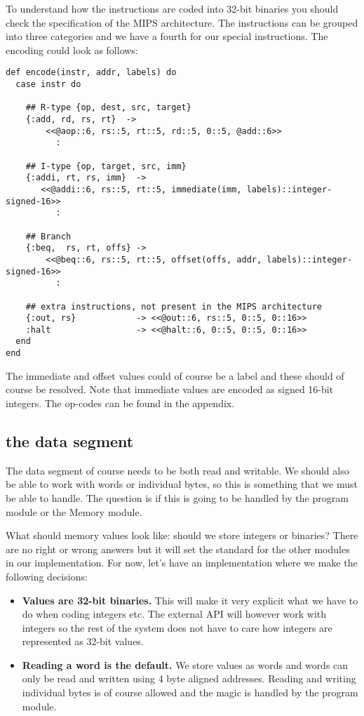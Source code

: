 \documentclass[a4paper,11pt]{article}
\begin{document}
To understand how the instructions are coded into 32-bit binaries you
should check the specification of the MIPS architecture. The
instructions can be grouped into three categories and we have a fourth
for our special instructions. The encoding could look as follows:

\begin{verbatim}
def encode(instr, addr, labels) do
  case instr do

    ## R-type {op, dest, src, target}
    {:add, rd, rs, rt}  -> 
        <<@aop::6, rs::5, rt::5, rd::5, 0::5, @add::6>>
          :

    ## I-type {op, target, src, imm}  
    {:addi, rt, rs, imm}  -> 
       <<@addi::6, rs::5, rt::5, immediate(imm, labels)::integer-signed-16>>	
          :
        
    ## Branch 
    {:beq,  rs, rt, offs} -> 
        <<@beq::6, rs::5, rt::5, offset(offs, addr, labels)::integer-signed-16>>
          :

    ## extra instructions, not present in the MIPS architecture 
    {:out, rs}            -> <<@out::6, rs::5, 0::5, 0::16>>
    :halt                 -> <<@halt::6, 0::5, 0::5, 0::16>>	
  end
end
\end{verbatim}

The immediate and offset values could of course be a label and these
should of course be resolved. Note that immediate values are encoded
as signed 16-bit integers. The op-codes can be found in the appendix. 

\subsection{the data segment}

The data segment of course needs to be both read and writable. We
should also be able to work with words or individual bytes, so this is
something that we must be able to handle. The question is if this is
going to be handled by the program module or the Memory module.

What should memory values look like: should we store integers or
binaries?  There are no right or wrong answers but it will set the
standard for the other modules in our implementation. For now, let's
have an implementation where we make the following decisions:

\begin{itemize}

\item {\bf Values are 32-bit binaries.}  This will make it very
  explicit what we have to do when coding integers etc. The external
  API will however work with integers so the rest of the system does
  not have to care how integers are represented as 32-bit values. 

\item {\bf Reading a word is the default.} We store values as words
  and words can only be read and written using 4 byte aligned
  addresses. Reading and writing individual bytes is of course allowed
  and the magic is handled by the program module.
\end{itemize}
\end{document}
